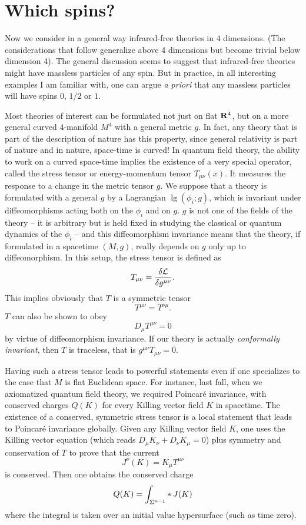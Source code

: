 \section{Which spins?}

Now we consider in a general way
infrared-free theories in $4$ dimensions.
(The considerations that follow generalize above 4 dimensions but
become trivial below dimension 4).  The general discussion seems to suggest
that infrared-free theories might have massless particles of any spin.
But in practice, in all interesting examples I am familiar with, one
can argue {\it a priori}
that any massless particles will have 
spins $0$, $1/2$ or $1$.


Most theories of interest can be formulated not just on flat ${\bf R}^4$,
but on a more general curved $4$-manifold $M^4$ with a general metric $g$.
In fact, any theory that is part of the description of nature has this
property, since general relativity is part of nature and in nature,
space-time is curved!
In quantum field theory, the ability to work on a curved space-time
implies the existence of a very special operator,
called the stress tensor or energy-momentum tensor $T_{\mu\nu}(x)$.
It measures the response to a change in the metric tensor $g$.
We suppose that  a theory is formulated with a general $g$ by a Lagrangian
$\lg(\phi_i;g)$, 
which  is invariant under diffeomorphisms acting both on the $\phi_i$ and on
$g$. $g$ is not one of the fields of the theory -- it is arbitrary
but is held fixed in studying the classical or quantum dynamics of the $\phi_i$
-- and this diffeomorphism invariance means that the theory,
if formulated in a spacetime $(M,g)$, really depends on $g$ only up to
diffeomorphism. In this setup,
the stress tensor is
defined as 
$$T_{\mu\nu}={\delta \lg\over \delta g^{\mu\nu}}.$$
This implies obviously that $T$ is a symmetric tensor
$$ T^{\mu\nu}=T^{\nu\mu}.$$
$T$ can also be shown to obey
$${D_\mu}T^{\mu\nu}=0$$
by virtue of diffeomorphism invariance.
If our theory is actually {\it conformally invariant}, then
$T$ is traceless, that is $g^{\mu\nu}T_{\mu\nu}=0$.

Having such a stress tensor leads to powerful statements even if
one specializes to the case that $M$ is flat Euclidean space. For instance,
last fall, when we axiomatized quantum field theory, we required
Poincar\'e invariance, with conserved charges $Q(K)$ for every Killing
vector field $K$ in spacetime.  The existence of a conserved, symmetric
stress tensor is a local statement that leads to Poincar\'e invariance
globally.  Given any Killing vector field $K$, one uses the Killing
vector equation (which reads $D_\mu K_\nu+D_\nu K_\mu=0$) plus symmetry
and conservation of $T$ to prove that the current
$$J^\nu(K)=K_\mu T^{\mu\nu}$$
is conserved.  Then one obtains the conserved charge
$$Q(K)=\int_{\Sigma^{n-1}}\hstar J(K)$$
where the integral is taken over an initial value  hypersurface
(such as time zero).

